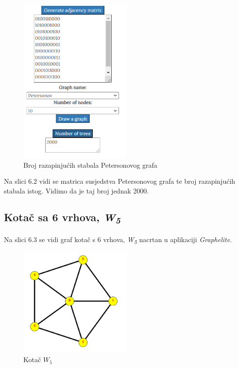 \documentclass[times, utf8, zavrsni]{fer}
\begin{document}
\begin{figure}[htb]
	\centering
	\includegraphics[width=0.5\textwidth]{slike/petersonovbroj.png}
	\caption{Broj razapinjućih stabala Petersonovog grafa}
	\label{fig:petersonov-broj}
\end{figure}

Na slici 6.2 vidi se matrica susjedstva Petersonovog grafa te broj razapinjućih stabala istog. Vidimo da je taj broj jednak 2000.

\subsection{Kotač sa 6 vrhova, \textit{W\textsubscript{5}}}

Na slici 6.3 se vidi graf kotač s 6 vrhova, \textit{W\textsubscript{5}} nacrtan u aplikaciji \textit{Graphelite}.

\begin{figure}[htb]
	\centering
	\includegraphics[width=0.5\textwidth]{slike/kotac2.png}
	\caption{Kotač $W_5$}
	\label{fig:kotac}
\end{figure}
\end{document}
